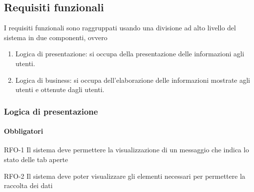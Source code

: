 \subsection{Requisiti funzionali}
\label{subsec:requisiti_funzionali}
I requisiti funzionali sono raggruppati usando una divisione ad alto livello del sistema in due componenti, ovvero 
\begin{enumerate}
    \item Logica di presentazione: si occupa della presentazione delle informazioni agli utenti.
    \item Logica di business: si occupa dell'elaborazione delle informazioni mostrate agli utenti e ottenute dagli utenti.
\end{enumerate}

\subsubsection{Logica di presentazione}

\paragraph{Obbligatori}

\begin{freq}
    {RFO-1}
    {Il sistema deve permettere la visualizzazione di un messaggio che indica lo stato delle tab aperte}
    \label{rf:RFO-1}%

\end{freq}

\begin{freq}
    {RFO-2}
    {Il sistema deve poter visualizzare gli elementi necessari per permettere la raccolta dei dati}
    \label{rf:RF2-3}%

\end{freq}

